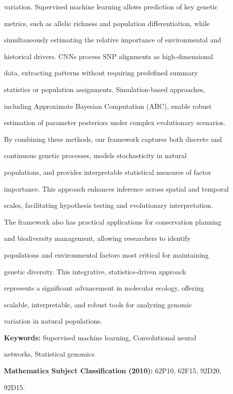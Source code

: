 \documentclass[10pt,twoside]{article}
\numberwithin{equation}{section}
\begin{document}
variation. Supervised machine learning allows prediction of key genetic

metrics, such as allelic richness and population differentiation, while

simultaneously estimating the relative importance of environmental and

historical drivers. CNNs process SNP alignments as high-dimensional

data, extracting patterns without requiring predefined summary

statistics or population assignments. Simulation-based approaches,

including Approximate Bayesian Computation (ABC), enable robust

estimation of parameter posteriors under complex evolutionary scenarios.

By combining these methods, our framework captures both discrete and

continuous genetic processes, models stochasticity in natural

populations, and provides interpretable statistical measures of factor

importance. This approach enhances inference across spatial and temporal

scales, facilitating hypothesis testing and evolutionary interpretation.

The framework also has practical applications for conservation planning

and biodiversity management, allowing researchers to identify

populations and environmental factors most critical for maintaining

genetic diversity. This integrative, statistics-driven approach

represents a significant advancement in molecular ecology, offering

scalable, interpretable, and robust tools for analyzing genomic

variation in natural populations.



\textbf{Keywords:} Supervised machine learning, Convolutional neural

networks, Statistical genomics



\textbf{Mathematics Subject Classification (2010):} 62P10, 62F15, 92D20,

92D15.
\end{document}
